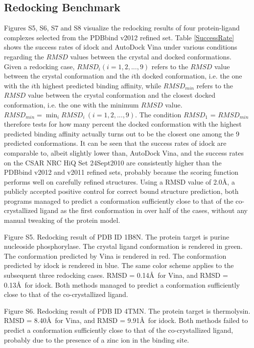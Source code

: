 \subsection{Redocking Benchmark}
Figures S5, S6, S7 and S8 visualize the redocking results of four protein-ligand complexes selected from the PDBbind v2012 refined set. Table \ref{SuccessRate} shows the success rates of idock and AutoDock Vina under various conditions regarding the $RMSD$ values between the crystal and docked conformations. Given a redocking case, $RMSD_i (i = 1,2,...,9)$ refers to the $RMSD$ value between the crystal conformation and the $i$th docked conformation, i.e. the one with the $i$th highest predicted binding affinity, while $RMSD_{min}$ refers to the $RMSD$ value between the crystal conformation and the closest docked conformation, i.e. the one with the minimum $RMSD$ value. $RMSD_{min} = \displaystyle\min_{i}RMSD_i\ (i = 1,2,...,9)$. The condition $RMSD_1$ = $RMSD_{min}$ therefore tests for how many percent the docked conformation with the highest predicted binding affinity actually turns out to be the closest one among the 9 predicted conformations. It can be seen that the success rates of idock are comparable to, albeit slightly lower than, AutoDock Vina, and the success rates on the CSAR NRC HiQ Set 24Sept2010 are consistently higher than the PDBbind v2012 and v2011 refined sets, probably because the scoring function performs well on carefully refined structures. Using a RMSD value of 2.0\AA, a publicly accepted positive control for correct bound structure prediction, both programs managed to predict a conformation sufficiently close to that of the co-crystallized ligand as the first conformation in over half of the cases, without any manual tweaking of the protein model.

Figure S5. Redocking result of PDB ID 1B8N. The protein target is purine nucleoside phosphorylase. The crystal ligand conformation is rendered in green. The conformation predicted by Vina is rendered in red. The conformation predicted by idock is rendered in blue. The same color scheme applies to the subsequent three redocking cases. RMSD = 0.14\AA\ for Vina, and RMSD = 0.13\AA\ for idock. Both methods managed to predict a conformation sufficiently close to that of the co-crystallized ligand.

Figure S6. Redocking result of PDB ID 4TMN. The protein target is thermolysin. RMSD = 8.40\AA\ for Vina, and RMSD = 9.91\AA\ for idock. Both methods failed to predict a conformation sufficiently close to that of the co-crystallized ligand, probably due to the presence of a zinc ion in the binding site.

